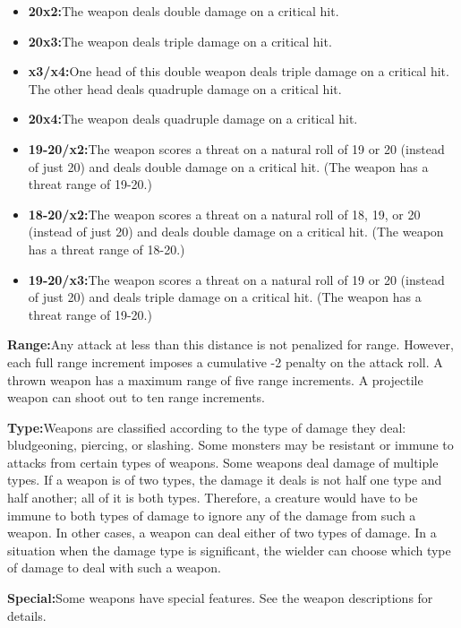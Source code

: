 \begin{itemize}
  \item\noindent\textbf{20x2:}{The weapon deals double damage on a critical hit.}
  \item\noindent\textbf{20x3:}{The weapon deals triple damage on a critical hit.}
  \item\noindent\textbf{x3/x4:}{One head of this double weapon deals triple damage on a critical hit. The other head deals quadruple damage on a critical hit.}
  \item\noindent\textbf{20x4:}{The weapon deals quadruple damage on a critical hit.}
  \item\noindent\textbf{19-20/x2:}{The weapon scores a threat on a natural roll of 19 or 20 (instead of just 20) and deals double damage on a critical hit. (The weapon has a threat range of 19-20.)}
  \item\noindent\textbf{18-20/x2:}{The weapon scores a threat on a natural roll of 18, 19, or 20 (instead of just 20) and deals double damage on a critical hit. (The weapon has a threat range of 18-20.)}
  \item\noindent\textbf{19-20/x3:}{The weapon scores a threat on a natural roll of 19 or 20 (instead of just 20) and deals triple damage on a critical hit. (The weapon has a threat range of 19-20.)}
\end{itemize}

\textbf{Range:}{Any attack at less than this distance is not penalized for range. However, each full range increment imposes a cumulative -2 penalty on the attack roll. A thrown weapon has a maximum range of five range increments. A projectile weapon can shoot out to ten range increments.}

\textbf{Type:}{Weapons are classified according to the type of damage they deal: bludgeoning, piercing, or slashing. Some monsters may be resistant or immune to attacks from certain types of weapons. Some weapons deal damage of multiple types. If a weapon is of two types, the damage it deals is not half one type and half another; all of it is both types. Therefore, a creature would have to be immune to both types of damage to ignore any of the damage from such a weapon.  In other cases, a weapon can deal either of two types of damage. In a situation when the damage type is significant, the wielder can choose which type of damage to deal with such a weapon.}

\textbf{Special:}{Some weapons have special features. See the weapon descriptions for details.}

